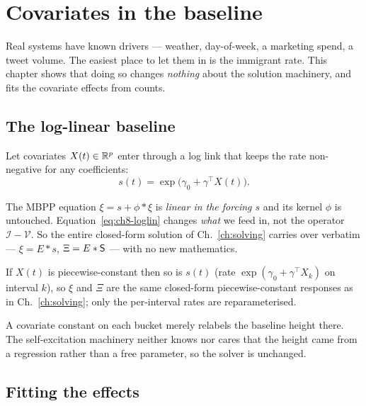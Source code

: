 \chapter{Covariates in the baseline}
\label{ch:baseline}

\begin{motivation}
Real systems have known drivers --- weather, day-of-week, a marketing spend, a
tweet volume. The easiest place to let them in is the immigrant rate. This chapter
shows that doing so changes \emph{nothing} about the solution machinery, and fits
the covariate effects from counts.
\end{motivation}

\section{The log-linear baseline}

Let covariates $X(t)\in\mathbb{R}^p$ enter through a log link that keeps the rate
non-negative for any coefficients:
\begin{equation}
s(t)=\exp\!\big(\gamma_0+\gamma^\top X(t)\big).
\label{eq:ch8-loglin}
\end{equation}

\begin{whybox}
The MBPP equation $\xi=s+\phi*\xi$ is \emph{linear in the forcing $s$} and its
kernel $\phi$ is untouched. Equation~\eqref{eq:ch8-loglin} changes \emph{what} we
feed in, not the operator $\mathcal I-\mathcal V$. So the entire closed-form
solution of Ch.~\ref{ch:solving} carries over verbatim --- $\xi=E*s$,
$\Xi=E*\mathsf{S}$ --- with no new mathematics.
\end{whybox}

\begin{proposition}
If $X(t)$ is piecewise-constant then so is $s(t)$ (rate
$\exp(\gamma_0+\gamma^\top X_k)$ on interval $k$), so $\xi$ and $\Xi$ are the same
closed-form piecewise-constant responses as in Ch.~\ref{ch:solving}; only the
per-interval rates are reparameterised.
\end{proposition}

\begin{intuitionbox}
A covariate constant on each bucket merely relabels the baseline height there. The
self-excitation machinery neither knows nor cares that the height came from a
regression rather than a free parameter, so the solver is unchanged.
\end{intuitionbox}

\section{Fitting the effects}

